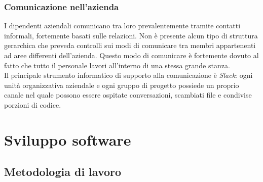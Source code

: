 			\subsubsection{Comunicazione nell'azienda}
				I dipendenti aziendali comunicano tra loro prevalentemente tramite contatti informali, fortemente basati sulle
				relazioni. Non è presente alcun tipo di struttura gerarchica che preveda controlli sui modi di comunicare tra membri
				appartenenti ad aree differenti dell'azienda. Questo modo di comunicare è fortemente dovuto al fatto che tutto il
				personale lavori all'interno di una stessa grande stanza.\\
				Il principale strumento informatico di supporto alla comunicazione è \emph{Slack}:
				ogni unità organizzativa aziendale e ogni gruppo di progetto possiede un proprio canale nel quale possono essere
				ospitate conversazioni, scambiati file e condivise porzioni di codice.
	\section{Sviluppo software}
		\subsection{Metodologia di lavoro}
